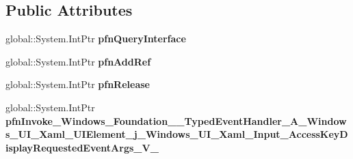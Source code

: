 \subsection*{Public Attributes}
\begin{DoxyCompactItemize}
\item 
\mbox{\label{struct_windows_1_1_foundation_1_1_typed_event_handler___a___windows___u_i___xaml___u_i_element__0a74a57359b62166d706be96094573e6_a0930e1a37ac12d61dfcb7c79413c9524}} 
global\+::\+System.\+Int\+Ptr {\bfseries pfn\+Query\+Interface}
\item 
\mbox{\label{struct_windows_1_1_foundation_1_1_typed_event_handler___a___windows___u_i___xaml___u_i_element__0a74a57359b62166d706be96094573e6_ae81670de8e48f4ab242ef3469072ebdb}} 
global\+::\+System.\+Int\+Ptr {\bfseries pfn\+Add\+Ref}
\item 
\mbox{\label{struct_windows_1_1_foundation_1_1_typed_event_handler___a___windows___u_i___xaml___u_i_element__0a74a57359b62166d706be96094573e6_a02b1270feb9b58c3f0d71b5c07e39bf7}} 
global\+::\+System.\+Int\+Ptr {\bfseries pfn\+Release}
\item 
\mbox{\label{struct_windows_1_1_foundation_1_1_typed_event_handler___a___windows___u_i___xaml___u_i_element__0a74a57359b62166d706be96094573e6_aabb5261251ad93e6d404c652919ececc}} 
global\+::\+System.\+Int\+Ptr {\bfseries pfn\+Invoke\+\_\+\+Windows\+\_\+\+Foundation\+\_\+\+\_\+\+Typed\+Event\+Handler\+\_\+\+A\+\_\+\+Windows\+\_\+\+U\+I\+\_\+\+Xaml\+\_\+\+U\+I\+Element\+\_\+j\+\_\+\+Windows\+\_\+\+U\+I\+\_\+\+Xaml\+\_\+\+Input\+\_\+\+Access\+Key\+Display\+Requested\+Event\+Args\+\_\+\+V\+\_\+}
\end{DoxyCompactItemize}
